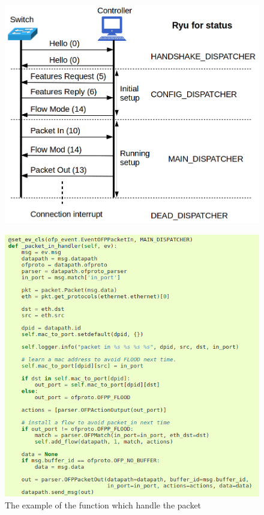 \documentclass[a4paper,12pt]{report}
\begin{document}
\begin{CJK*}{UTF8}{bkai}
\begin{large}
\begin{figure}[p]
	          	\includegraphics[width=1.0\textwidth]{ryu_graph.png}
	          
	      	\end{figure}
	     \begin{figure}[p]
	          \centering
	          \caption{The example of the function which handle the packet}
	          	\includegraphics[width=1.0\textwidth]{packet_in_handler.png}
	      	\end{figure}

\end{large}
\end{CJK*}
\end{document}
